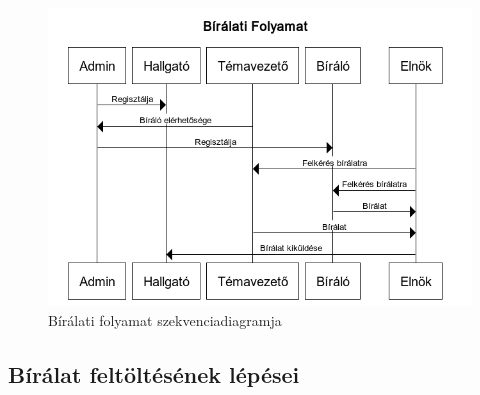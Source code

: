 \begin{figure}[h]
\centering
\includegraphics[scale=0.8]{images/Bírálati_folyamat.png}
\caption{Bírálati folyamat szekvenciadiagramja}
\label{fig:biralati_folyamat}
\end{figure}

\subsection{Bírálat feltöltésének lépései}


